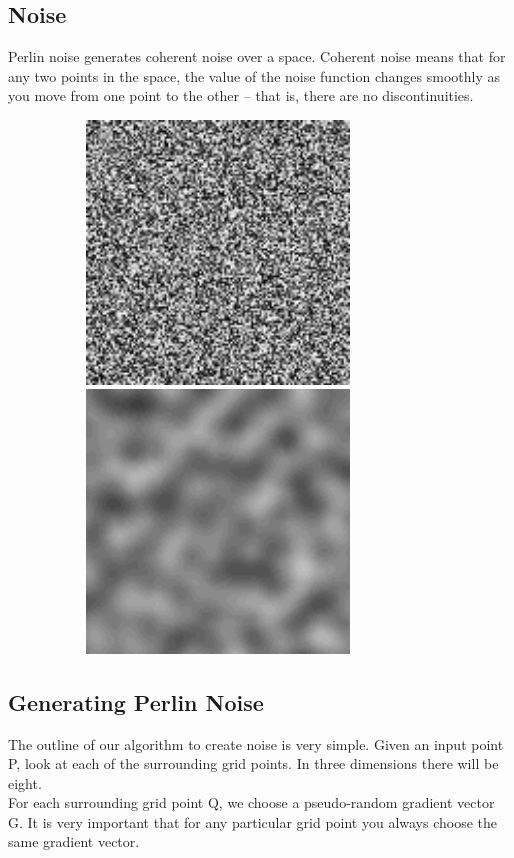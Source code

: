\documentclass[article]{report}         %
\begin{document}
        \subsection{Noise}
          Perlin noise generates coherent noise over a space. Coherent noise means that for any two points in the space, the value of the noise function changes smoothly as you move from one point to the other -- that is, there are no discontinuities.\\

          \begin{figure}[h]
              \includegraphics[width=9cm, height=7cm]{images/Noise/noncoherent.png}
              \includegraphics[width=9cm, height=7cm]{images/Noise/coherent.png}
            \end{figure}

          \subsection{Generating Perlin Noise}
            The outline of our algorithm to create noise is very simple. Given an input point P, look at each of the surrounding grid points. In three dimensions there will be eight.\\
            For each surrounding grid point Q, we choose a pseudo-random gradient vector G. It is very important that for any particular grid point you always choose the same gradient vector. 
\end{document}

